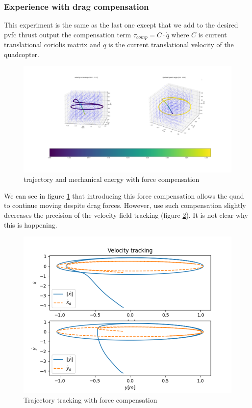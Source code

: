 \subsubsection{Experience with drag compensation}
This experiment is the same as the last one except that we add to the desired pvfc thrust output the compensation term $\tau_{comp} = C\cdot \dot{q}$ 
where $C$ is current translational coriolis matrix and $\dot{q}$ is the current translational velocity of the quadcopter.
\begin{figure}[h!]
   \centering
   \includegraphics[width=\linewidth]{Images/python-forcecomp.png}
   \caption{trajectory and mechanical energy with force compensation }
   \label{fig:pythoncomp}
\end{figure}
We can see in figure \ref{fig:pythoncomp} that introducing this force compensation allows the quad to continue moving despite drag forces. 
However, use such compensation slightly decreases the precision of the velocity field tracking (figure \ref{fig:trajtrackcomp}). It is not clear why this is happening.
\begin{figure}[h!]
   \centering
   \includegraphics[width=\linewidth]{Images/velocitytrackingpythoncomp.png}
   \caption{Trajectory tracking with force compensation }
   \label{fig:trajtrackcomp}
\end{figure}

